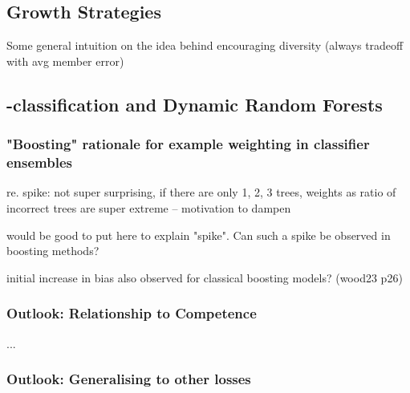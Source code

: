 \documentclass[
    a4paper, %
	fontsize=10pt, %
	twoside=false, %
]{kaobook}
\begin{document}
\begin{titlepage}
\chapter{Growth Strategies}

Some general intuition on the idea behind encouraging diversity (always tradeoff with avg member error)


\section{\zeroone-classification and Dynamic Random Forests}
\label{sec:dynamic-random-forests}


\subsection{"Boosting" rationale for example weighting in classifier ensembles}

re. spike: not super surprising, if there are only 1, 2, 3 trees, weights as ratio of incorrect trees are super extreme -- motivation to dampen

would be good to put here to explain "spike". Can such a spike be observed in boosting methods?

initial increase in bias also observed for classical boosting models? (wood23 p26)


\subsection{Outlook: Relationship to Competence}
...

\subsection{Outlook: Generalising to other losses}



\end{titlepage}
\end{document}
